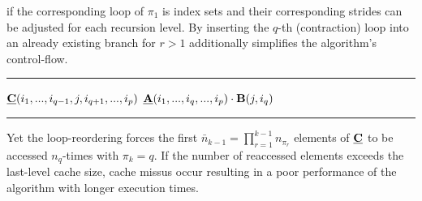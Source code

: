 if the corresponding loop of $\pi_1$ is 
index sets and their corresponding strides can be adjusted for each recursion level.
By inserting the $q$-th (contraction) loop into an already existing branch for $r>1$ additionally simplifies the algorithm's control-flow.
\begin{algorithm}[t]
\DontPrintSemicolon
{}
%
\footnotesize 
\SetAlgoVlined
\hrule
\BlankLine
{}
{
	{
	}
	{
		{
			\;
		}		
	}	
	\Else%
	{
		{
			{			
				{
					$\underline{\mathbf{C}}(i_1,...,i_{q-1},j,i_{q+1},...,i_{p})$ \ttt{+=} $\underline{\mathbf{A}}(i_1,...,i_q,...,i_p) \cdot \mathbf{B}(j,i_q)$\;
				}
			}
		}
	}
}
\BlankLine
\hrule
\caption{
\footnotesize %
Recursive implementation of the tensor-matrix multiplication in Eq. \eqref{equ:tensor.matrix.multplication} for $p \geq 2$ and $1 \leq q \leq p$ and $\pi_1 \neq q$ with better data locality for large dimensions.
The algorithm needs to be initially called with $r=p$ where $\mbn$ is the shape tuple of $\mubA$ and $m$ is the $q$-th dimension of $\mubC$. 
Iteration along mode $\mhq$ with $\mhq = \mbpi^{-1}_q$ is moved into the inner-most recursion level.
\label{alg:ttm.sequential.coalesced}
}
\end{algorithm}
Yet the loop-reordering forces the first $\bar{n}_{k-1} = \prod_{r=1}^{k-1} n_{\pi_r}$ elements of $\mubC$ to be accessed $n_q$-times with $\pi_k = q$.
If the number of reaccessed elements exceeds the last-level cache size, cache missus occur resulting in a poor performance of the algorithm with longer execution times.

